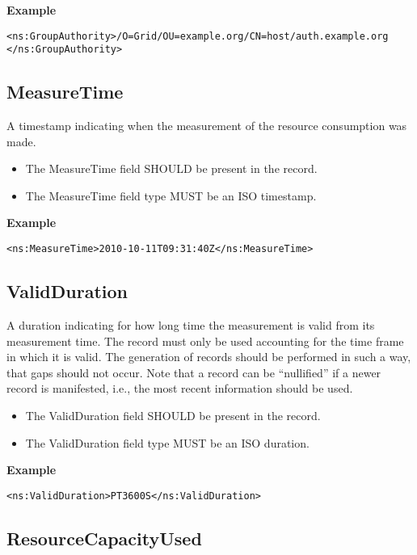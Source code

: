 {\bf Example}
\begin{verbatim}
<ns:GroupAuthority>/O=Grid/OU=example.org/CN=host/auth.example.org
</ns:GroupAuthority>
\end{verbatim}



\subsection{MeasureTime}

A timestamp indicating when the measurement of the resource consumption was
made.

\begin{itemize}
\item The MeasureTime field SHOULD be present in the record.
\item The MeasureTime field type MUST be an ISO timestamp.
\end{itemize}

{\bf Example}
\begin{verbatim}
<ns:MeasureTime>2010-10-11T09:31:40Z</ns:MeasureTime>
\end{verbatim}


\subsection{ValidDuration}

A duration indicating for how long time the measurement is valid from its
measurement time. The record must only be used accounting for the time frame in
which it is valid. The generation of records should be performed in such a way,
that gaps should not occur. Note that a record can be ``nullified'' if a newer
record is manifested, i.e., the most recent information should be used.

\begin{itemize}
\item The ValidDuration field SHOULD be present in the record.
\item The ValidDuration field type MUST be an ISO duration.
\end{itemize}

{\bf Example}
\begin{verbatim}
<ns:ValidDuration>PT3600S</ns:ValidDuration>
\end{verbatim}


\subsection{ResourceCapacityUsed}

